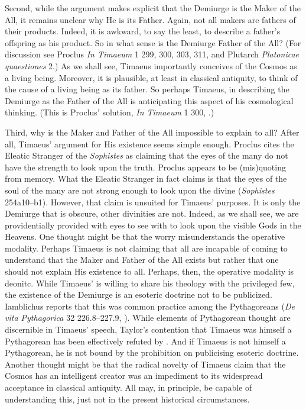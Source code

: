 Second, while the argument makes explicit that the Demiurge is the Maker of the All, it remains unclear why He is its Father. Again, not all makers are fathers of their products. Indeed, it is awkward, to say the least, to describe a father's offspring as his product. So in what sense is the Demiurge Father of the All? (For discussion see Proclus \emph{In Timaeum} 1 299, 300, 303, 311, \citealt{Diehl:1903re} and Plutarch \emph{Platonicae quaestiones} 2.) As we shall see, Timaeus importantly conceives of the Cosmos as a living being. Moreover, it is plausible, at least in classical antiquity, to think of the cause of a living being as its father. So perhaps Timaeus, in describing the Demiurge as the Father of the All is anticipating this aspect of his cosmological thinking. (This is Proclus' solution, \emph{In Timaeum} 1 300, \citealt{Diehl:1903re}.)

Third, why is the Maker and Father of the All impossible to explain to all? After all, Timaeus' argument for His existence seems simple enough. Proclus cites the Eleatic Stranger of the \emph{Sophistes} as claiming that the eyes of the many do not have the strength to look upon the truth. Proclus appears to be (mis)quoting from memory. What the Eleatic Stranger in fact claims is that the eyes of the soul of the many are not strong enough to look upon the divine (\emph{Sophistes} 254a10--b1). However, that claim is unsuited for Timaeus' purposes. It is only the Demiurge that is obscure, other divinities are not. Indeed, as we shall see, we are providentially provided with eyes to see with to look upon the visible Gods in the Heavens. One thought might be that the worry misunderstands the operative modality. Perhaps Timaeus is not claiming that all are incapable of coming to understand that the Maker and Father of the All exists but rather that one should not explain His existence to all. Perhaps, then, the operative modality is deonitc. While Timaeus' is willing to share his theology with the privileged few, the existence of the Demiurge is an esoteric doctrine not to be publicized. Iamblichus reports that this was common practice among the Pythagoreans (\emph{De vita Pythagorica} 32 226.8--227.9, \citealt{Deubner:1937ys}). While elements of Pythagorean thought are discernible in Timaeus' speech, Taylor's \citeyearpar{Taylor:1928qb} contention that Timaeus was himself a Pythagorean has been effectively refuted by \citet{Cornford:1935fk}. And if Timaeus is not himself a Pythagorean, he is not bound by the prohibition on publicising esoteric doctrine. Another thought might be that the radical novelty of Timaeus claim that the Cosmos has an intelligent creator was an impediment to its widespread acceptance in classical antiquity. All may, in principle, be capable of understanding this, just not in the present historical circumstances.


